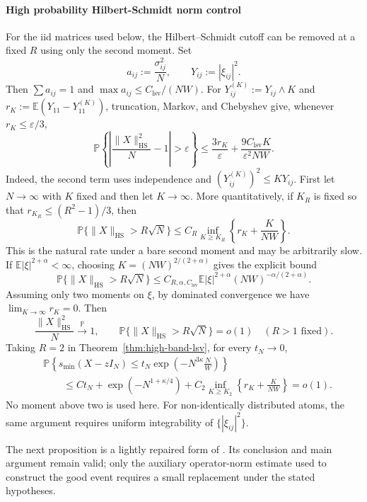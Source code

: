 \documentclass[11pt,reqno]{amsart}
\numberwithin{equation}{section}
\theoremstyle{definition}
\theoremstyle{remark}
\newcommand{\E}{\mathbb E}
\newcommand{\Pp}{\mathbb P}
\newcommand{\1}{\mathbf 1}
\newcommand{\HS}{\mathrm{HS}}
\begin{document}
\paragraph{High probability Hilbert-Schmidt norm control}
For the iid matrices used below, the Hilbert--Schmidt cutoff can be removed
at a fixed $R$ using only the second moment.  Set
\[
 a_{ij}:=\frac{\sigma_{ij}^2}{N},\qquad Y_{ij}:=|\xi_{ij}|^2.
\]
Then $\sum a_{ij}=1$ and
$\max a_{ij}\le C_{\mathrm{lsv}}/(NW)$.  For
$Y_{ij}^{(K)}:=Y_{ij}\wedge K$ and
$r_K:=\E(Y_{11}-Y_{11}^{(K)})$, truncation, Markov, and Chebyshev give,
whenever $r_K\le\varepsilon/3$,
\[
 \Pp\left\{\left|\frac{\|X\|_{\HS}^2}{N}-1\right|>\varepsilon\right\}
 \le \frac{3r_K}{\varepsilon}
 +\frac{9C_{\mathrm{lsv}}K}{\varepsilon^2NW}.
\]
Indeed, the second term uses independence and
$(Y_{ij}^{(K)})^2\le K Y_{ij}$.  First let $N\to\infty$ with $K$ fixed
and then let $K\to\infty$.  More quantitatively, if
$K_R$ is fixed so that $r_{K_R}\le(R^2-1)/3$, then
\begin{equation}\label{eq:HS-quantitative-tail}
 \Pp\{\|X\|_{\HS}>R\sqrt N\}
 \le C_R\inf_{K\ge K_R}
 \left\{r_K+\frac{K}{NW}\right\}.
\end{equation}
This is the natural rate under a bare second moment and may be arbitrarily
slow.  If $\E|\xi|^{2+\alpha}<\infty$, choosing
$K=(NW)^{2/(2+\alpha)}$ gives the explicit bound
\begin{equation}\label{eq:HS-quantitative-moment}
 \Pp\{\|X\|_{\HS}>R\sqrt N\}
 \le C_{R,\alpha,C_{\mathrm{lsv}}}\E|\xi|^{2+\alpha}
 (NW)^{-\alpha/(2+\alpha)}.
\end{equation}
Assuming only two moments on $\xi$, by dominated convergence we have $\lim_{K\to\infty}r_K=0$. Then
\begin{equation}\label{eq:lsv-remove-HS-cutoff}
 \frac{\|X\|_{\HS}^2}{N}\xrightarrow{\Pp}1,
 \qquad
 \Pp\{\|X\|_{\HS}>R\sqrt N\}=o(1)
 \quad(R>1\text{ fixed}).
\end{equation}
Taking $R=2$ in Theorem~\ref{thm:high-band-lsv}, for every $t_N\to0$,
\begin{align*}
 &\Pp\left\{s_{\min}(X-zI_N)
 \le t_N\exp\left(-N^{3\kappa}\frac NW\right)\right\}\\
 &\qquad\le C t_N+\exp(-N^{1+\kappa/4})
 +C_2\inf_{K\ge K_2}\left\{r_K+\frac{K}{NW}\right\}=o(1).
\end{align*}
No moment above two is used here.  For non-identically distributed atoms,
the same argument requires uniform integrability of
$\{|\xi_{ij}|^2\}$.

The next proposition is a lightly repaired form of
\cite[Theorem~2.1]{JainJanaLuhORourke2021}.  Its conclusion and main
argument remain valid; only the auxiliary operator-norm estimate used to
construct the good event requires a small replacement under the stated
hypotheses.
\end{document}
